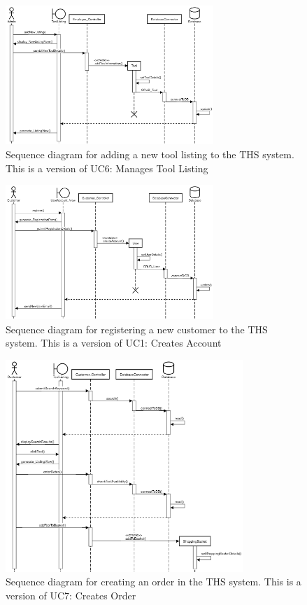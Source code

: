\begin{figure}[H]
      \centering
      \includegraphics[trim = 0 0 0 0, clip, width=0.7\textwidth]{TempImg/add_new_tool_SD.png}
      \caption{Sequence diagram for adding a new tool listing to the THS system. This is a version of UC6: Manages Tool Listing}
\end{figure}

\begin{figure}[H]
      \centering
      \includegraphics[trim = 0 0 0 0, clip, width=0.7\textwidth]{TempImg/new_user_reg_SD.png}
      \caption{Sequence diagram for registering a new customer to the THS system. This is a version of UC1: Creates Account}
\end{figure}

\begin{figure}[H]
      \centering
      \includegraphics[trim = 0 0 0 0, clip, width=0.8\textwidth]{TempImg/create_order_SD.png}
      \caption{Sequence diagram for creating an order in the THS system. This is a version of UC7: Creates Order}
\end{figure}

